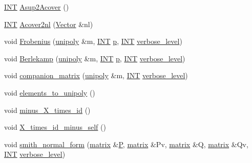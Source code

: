 \begin{DoxyCompactItemize}
\item 
\mbox{\hyperlink{galois_8h_a09fddde158a3a20bd2dcadb609de11dc}{I\+NT}} \mbox{\hyperlink{classmatrix_a606cce1a9d6430b751090e27ef31d2e4}{Asup2\+Acover}} ()
\item 
\mbox{\hyperlink{galois_8h_a09fddde158a3a20bd2dcadb609de11dc}{I\+NT}} \mbox{\hyperlink{classmatrix_a331c7926e93599378a25791e982b3c89}{Acover2nl}} (\mbox{\hyperlink{class_vector}{Vector}} \&nl)
\item 
void \mbox{\hyperlink{classmatrix_aa08a0bfacde81b35248690c099155bed}{Frobenius}} (\mbox{\hyperlink{classunipoly}{unipoly}} \&m, \mbox{\hyperlink{galois_8h_a09fddde158a3a20bd2dcadb609de11dc}{I\+NT}} \mbox{\hyperlink{alphabet2_8_c_a533391314665d6bf1b5575e9a9cd8552}{p}}, \mbox{\hyperlink{galois_8h_a09fddde158a3a20bd2dcadb609de11dc}{I\+NT}} \mbox{\hyperlink{simeon_8_c_a818073fbcc2f439e7c56952f67386122}{verbose\+\_\+level}})
\item 
void \mbox{\hyperlink{classmatrix_ac98dd867d9148831126eaddd13b7da60}{Berlekamp}} (\mbox{\hyperlink{classunipoly}{unipoly}} \&m, \mbox{\hyperlink{galois_8h_a09fddde158a3a20bd2dcadb609de11dc}{I\+NT}} \mbox{\hyperlink{alphabet2_8_c_a533391314665d6bf1b5575e9a9cd8552}{p}}, \mbox{\hyperlink{galois_8h_a09fddde158a3a20bd2dcadb609de11dc}{I\+NT}} \mbox{\hyperlink{simeon_8_c_a818073fbcc2f439e7c56952f67386122}{verbose\+\_\+level}})
\item 
void \mbox{\hyperlink{classmatrix_acd603a86fd752eb4da1a060bdaab478f}{companion\+\_\+matrix}} (\mbox{\hyperlink{classunipoly}{unipoly}} \&m, \mbox{\hyperlink{galois_8h_a09fddde158a3a20bd2dcadb609de11dc}{I\+NT}} \mbox{\hyperlink{simeon_8_c_a818073fbcc2f439e7c56952f67386122}{verbose\+\_\+level}})
\item 
void \mbox{\hyperlink{classmatrix_aee7e0d79d2c1ef32f0cbebbcc7f40771}{elements\+\_\+to\+\_\+unipoly}} ()
\item 
void \mbox{\hyperlink{classmatrix_a3c2f7a8bafecd1eb355c245cf0e157b2}{minus\+\_\+\+X\+\_\+times\+\_\+id}} ()
\item 
void \mbox{\hyperlink{classmatrix_a42aa27f4ae06ceff8cb297894bb5aad4}{X\+\_\+times\+\_\+id\+\_\+minus\+\_\+self}} ()
\item 
void \mbox{\hyperlink{classmatrix_aeb73764dd4346bb1a6998f2a3c507544}{smith\+\_\+normal\+\_\+form}} (\mbox{\hyperlink{classmatrix}{matrix}} \&\mbox{\hyperlink{simeon_8_c_a7fa15551e800919e93401fbbcd8e71e8}{P}}, \mbox{\hyperlink{classmatrix}{matrix}} \&Pv, \mbox{\hyperlink{classmatrix}{matrix}} \&Q, \mbox{\hyperlink{classmatrix}{matrix}} \&Qv, \mbox{\hyperlink{galois_8h_a09fddde158a3a20bd2dcadb609de11dc}{I\+NT}} \mbox{\hyperlink{simeon_8_c_a818073fbcc2f439e7c56952f67386122}{verbose\+\_\+level}})

\end{DoxyCompactItemize}
